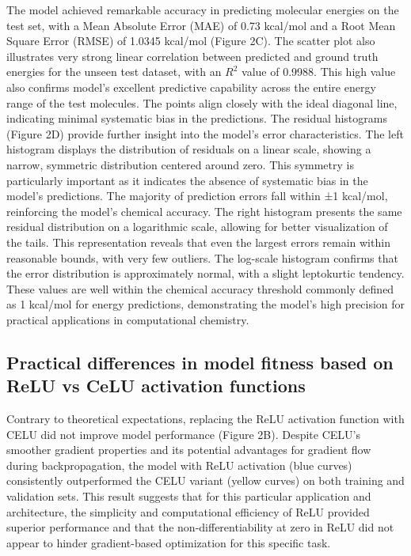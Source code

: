 \documentclass[11pt, twocolumn]{article}
\begin{document}
The model achieved remarkable accuracy in predicting molecular energies on the test set, with a Mean Absolute Error (MAE) of 0.73 kcal/mol and a Root Mean Square Error (RMSE) of 1.0345 kcal/mol (Figure 2C). The scatter plot also illustrates very strong linear correlation between predicted and ground truth energies for the unseen test dataset, with an $R^2$ value of 0.9988. This high value also confirms model's excellent predictive capability across the entire energy range of the test molecules. The points align closely with the ideal diagonal line, indicating minimal systematic bias in the predictions. The residual histograms (Figure 2D) provide further insight into the model's error characteristics. The left histogram displays the distribution of residuals on a linear scale, showing a narrow, symmetric distribution centered around zero. This symmetry is particularly important as it indicates the absence of systematic bias in the model's predictions. The majority of prediction errors fall within ±1 kcal/mol, reinforcing the model's chemical accuracy. The right histogram presents the same residual distribution on a logarithmic scale, allowing for better visualization of the tails. This representation reveals that even the largest errors remain within reasonable bounds, with very few outliers. The log-scale histogram confirms that the error distribution is approximately normal, with a slight leptokurtic tendency. These values are well within the chemical accuracy threshold commonly defined as 1 kcal/mol for energy predictions, \cite{bogojeski2020quantum} demonstrating the model's high precision for practical applications in computational chemistry.

\subsection{Practical differences in model fitness based on ReLU vs CeLU activation functions}
Contrary to theoretical expectations, replacing the ReLU activation function with CELU did not improve model performance (Figure 2B). Despite CELU's smoother gradient properties and its potential advantages for gradient flow during backpropagation, the model with ReLU activation (blue curves) consistently outperformed the CELU variant (yellow curves) on both training and validation sets. This result suggests that for this particular application and architecture, the simplicity and computational efficiency of ReLU provided superior performance and that the non-differentiability at zero in ReLU did not appear to hinder gradient-based optimization for this specific task.
\end{document}

